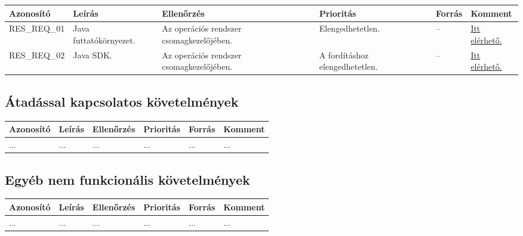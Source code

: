 
\begin{longtable}{| l | l | p{3cm} | p{3cm} | l | l |}
\hline
\textbf{Azonosító}   & \textbf{Leírás} & \textbf{Ellenőrzés} & \textbf{Prioritás} & \textbf{Forrás} & \textbf{Komment} \tabularnewline
\hline\hline
RES\_REQ\_01 & Java futtatókörnyezet. & Az operációs rendszer csomagkezelőjében. & Elengedhetetlen. & -- & \href{https://www.java.com/en/download/}{Itt elérhető.} \tabularnewline
\hline
RES\_REQ\_02 & Java SDK. & Az operációs rendszer csomagkezelőjében. & A fordításhoz elengedhetetlen. & -- & \href{https://www.oracle.com/java/technologies/javase/javase-jdk8-downloads.html}{Itt elérhető.} \tabularnewline
\hline
\end{longtable}


\subsection{Átadással kapcsolatos követelmények}

\begin{longtable}{| l | l | l | l | l | l |}
\hline
\textbf{Azonosító}   & \textbf{Leírás} & \textbf{Ellenőrzés} & \textbf{Prioritás} & \textbf{Forrás} & \textbf{Komment} \tabularnewline
\hline\hline
... & ... & ... & ... & ... & ... \tabularnewline
\hline
\end{longtable}

\subsection{Egyéb nem funkcionális követelmények}

\begin{longtable}{| l | l | l | l | l | l |}
\hline
\textbf{Azonosító}   & \textbf{Leírás} & \textbf{Ellenőrzés} & \textbf{Prioritás} & \textbf{Forrás} & \textbf{Komment} \tabularnewline
\hline\hline
... & ... & ... & ... & ... & ... \tabularnewline
\hline
\end{longtable}


